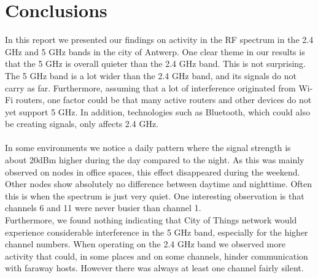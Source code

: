 \documentclass[a4paper, 11pt]{article}
\begin{document}
\section{Conclusions}
In this report we presented our findings on activity in the RF spectrum in the 2.4 GHz and 5 GHz bands in the city of Antwerp. One clear theme in our results is that the 5 GHz is overall quieter than the 2.4 GHz band. This is not surprising. The 5 GHz band is a lot wider than the 2.4 GHz band, and its signals do not carry as far. Furthermore, assuming that a lot of interference originated from Wi-Fi routers, one factor could be that many active routers and other devices do not yet support 5 GHz. In addition, technologies such as Bluetooth, which could also be creating signals, only affects 2.4 GHz.\\ \\
In some environments we notice a daily pattern where the signal strength is about 20dBm higher during the day compared to the night. As this was mainly observed on nodes in office spaces, this effect disappeared during the weekend. Other nodes show absolutely no difference between daytime and nighttime. Often this is when the spectrum is just very quiet. One interesting observation is that channels 6 and 11 were never busier than channel 1. \\
Furthermore, we found nothing indicating that City of Things network would experience considerable interference in the 5 GHz band, especially for the higher channel numbers. When operating on the 2.4 GHz band we observed more activity that could, in some places and on some channels, hinder communication with faraway hosts. However there was always at least one channel fairly silent.






\end{document}
